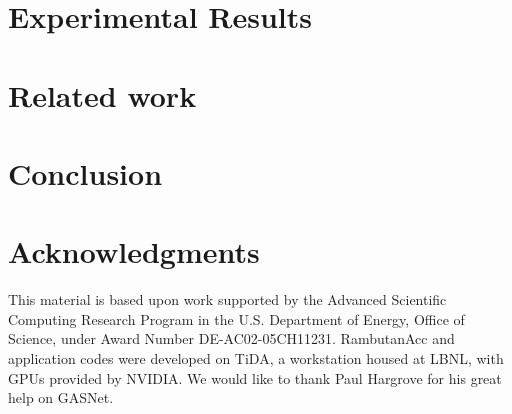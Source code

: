\documentclass{llncs}
\begin{document}
\section{Experimental Results}
\label{sec:results}


\section{Related work}
\label{sec:related}


\section{Conclusion}
\label{sec:conclusion}


\section*{Acknowledgments}
This material is based upon work supported by the Advanced Scientific Computing Research Program in the U.S. Department of Energy, Office of Science, under  Award Number DE-AC02-05CH11231.
RambutanAcc and application codes were developed on TiDA, a workstation housed at LBNL, with GPUs provided by NVIDIA.
We would like to thank Paul Hargrove for his great help on GASNet.

%


 
\end{document}
